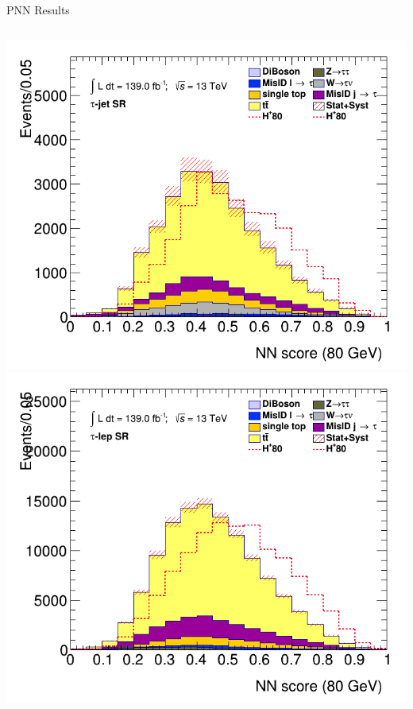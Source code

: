 \documentclass[aspectratio=169,xcolor=table]{beamer}
\begin{document}
    \begin{frame}[t]{PNN Results}
      \begin{columns}[t]
        \includegraphics[height=.43\textheight,keepaspectratio=true]{clf_score_GB200_mass_80to80_SR_TAUJET.png}
        \includegraphics[height=.43\textheight,keepaspectratio=true]{clf_score_GB200_mass_80to80_SR_TAULEP.png}


\end{columns}
\end{frame}
\end{document}
